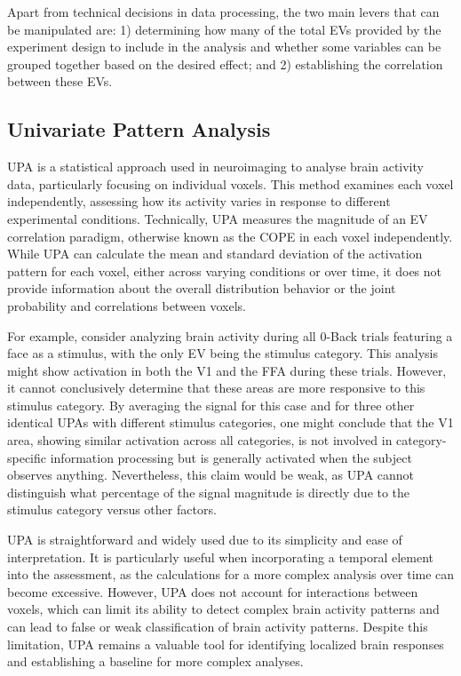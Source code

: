 
Apart from technical decisions in data processing, the two main levers that can be manipulated are: 1) determining how many of the total \gls{EV}s provided by the experiment design to include in the analysis and whether some variables can be grouped together based on the desired effect; and 2) establishing the correlation between these \gls{EV}s.

\subsection{Univariate Pattern Analysis}

\gls{UPA} is a statistical approach used in neuroimaging to analyse brain activity data, particularly focusing on individual voxels. This method examines each voxel independently, assessing how its activity varies in response to different experimental conditions. Technically, \gls{UPA} measures the magnitude of an \gls{EV} correlation paradigm, otherwise known as the \gls{COPE} in each voxel independently. While \gls{UPA} can calculate the mean and standard deviation of the activation pattern for each voxel, either across varying conditions or over time, it does not provide information about the overall distribution behavior or the joint probability and correlations between voxels.

For example, consider analyzing brain activity during all 0-Back trials featuring a face as a stimulus, with the only \gls{EV} being the stimulus category. This analysis might show activation in both the \gls{V1} and the \gls{FFA} during these trials. However, it cannot conclusively determine that these areas are more responsive to this stimulus category. By averaging the signal for this case and for three other identical \gls{UPA}s with different stimulus categories, one might conclude that the \gls{V1} area, showing similar activation across all categories, is not involved in category-specific information processing but is generally activated when the subject observes anything. Nevertheless, this claim would be weak, as \gls{UPA} cannot distinguish what percentage of the signal magnitude is directly due to the stimulus category versus other factors.

\gls{UPA} is straightforward and widely used due to its simplicity and ease of interpretation. It is particularly useful when incorporating a temporal element into the assessment, as the calculations for a more complex analysis over time can become excessive. However, \gls{UPA} does not account for interactions between voxels, which can limit its ability to detect complex brain activity patterns and can lead to false or weak classification of brain activity patterns. Despite this limitation, \gls{UPA} remains a valuable tool for identifying localized brain responses and establishing a baseline for more complex analyses.

